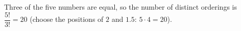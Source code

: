 Three of the five numbers are equal, so the number of distinct orderings is $\dfrac{5!}{3!}=\boxed{20}$ (choose the positions of $2$ and $1.5$: $5\cdot4=20$).
